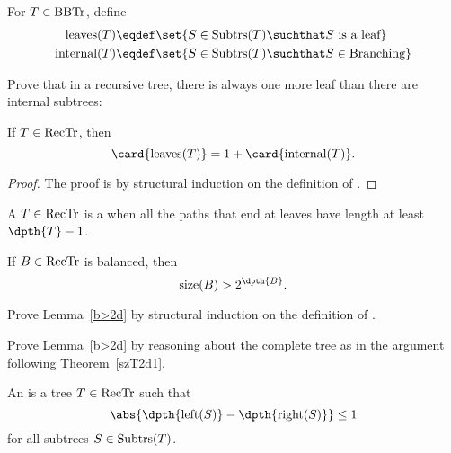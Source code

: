\begin{definition}
\begin{problem}
For $T \in \text{BBTr}$, define
\begin{align*}
\text{leaves}(T)   & \eqdef \set{S \in \subbrn{T} \suchthat S\ \text{is a leaf}}\\
\text{internal}(T) & \eqdef \set{S \in \subbrn{T} \suchthat S \in \brnchng}
\end{align*}

Prove that in a recursive tree, there is always one more leaf than
there are internal subtrees:

\begin{lemma*}
If $T \in \text{RecTr}$, then
\[
\card{\text{leaves}(T)} = 1 + \card{\text{internal}(T)}.
\]
\end{lemma*}
\begin{solution}

\begin{proof}
The proof is by structural induction on the definition of \rectr.

\end{proof} 
\end{solution}
\end{problem}

A $T \in \text{RecTr}$ is a  when all the paths that end at
leaves have length at least $\dpth{T} - 1$.

\begin{lemma}\label{b>2d}
If $B \in \text{RecTr}$ is balanced, then
\[
\text{size}(B) > 2^{\dpth{B}}.
\]
\end{lemma}

\begin{problem}
Prove Lemma~\ref{b>2d} by structural induction on the definition of \rectr.

\begin{solution}
\end{solution}
\end{problem}

\begin{problem}
Prove Lemma~\ref{b>2d} by reasoning about the complete tree as in the
argument following Theorem~\ref{szT2d1}.

\begin{solution}
\end{solution}
\end{problem}

An  is a tree $T\in \text{RecTr}$ such that
\[
\abs{\dpth{\leftsub{(S)}} - \dpth{\rightsub{(S)}}} \leq 1
\]
for all subtrees $S \in \text{Subtrs}(T)$.


\end{definition}
